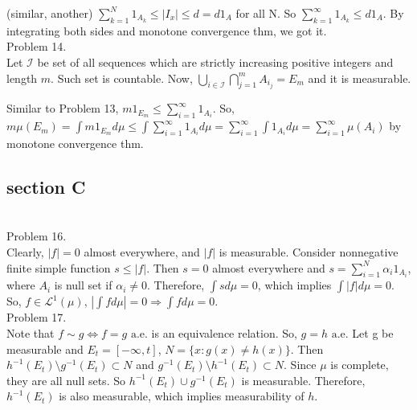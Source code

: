 (similar, another) $\sum_{k=1}^N 1_{A_k} \leq \left | I_x \right | \leq d = d 1_A$ for all N.
So $\sum_{k=1}^{\infty} 1_{A_k} \leq d1_A$.
By integrating both sides and monotone convergence thm, we got it.\\

Problem 14. \\

Let $\mathcal{I}$ be set of all sequences which are strictly increasing positive integers and length $m$.
Such set is countable. Now, $\bigcup_{i \in \mathcal{I}} \bigcap_{j=1}^m A_{i_j} = E_m$ and it is measurable.

Similar to Problem 13, $m 1_{E_m} \leq \sum_{i=1}^{\infty}1_{A_i}$.
So, $m \mu(E_m) = \int m 1_{E_m} d\mu \leq \int \sum_{i=1}^{\infty}1_{A_i} d\mu = \sum_{i=1}^{\infty} \int 1_{A_i} d\mu = \sum_{i=1}^{\infty}\mu(A_i)$ by monotone convergence thm.

\subsection*{section C} \hfill \\

Problem 16. \\

Clearly, $ \lvert f \rvert = 0$ almost everywhere, and $\lvert f \rvert$ is measurable.
Consider nonnegative finite simple function $s \leq \lvert f \rvert$. Then $s=0$ almost everywhere
and $s = \sum_{i=1}^N \alpha_i 1_{A_i}$, where $A_i$ is null set if $\alpha_i \ne 0$.
Therefore, $\int s d\mu = 0$, which implies $\int \lvert f \rvert d\mu = 0$.
So, $f \in \mathcal{L}^1(\mu)$, $\left | \int f d \mu \right | =0 \Rightarrow \int f d \mu = 0$.\\

Problem 17. \\

Note that $f \sim g \Leftrightarrow f = g\text{ a.e.}$ is an equivalence relation.
So, $g = h \text{ a.e}$.
Let g be measurable and $E_t = \left [ -\infty, t \right]$, $N = \{ x : g(x) \ne h(x)\}$.
Then $h^{-1}(E_t) \setminus g^{-1}(E_t) \subset N$ and $g^{-1}(E_t) \setminus h^{-1}(E_t) \subset N$.
Since $\mu$ is complete, they are all null sets. So $h^{-1}(E_t) \cup g^{-1}(E_t)$ is measurable.
Therefore, $h^{-1}(E_t)$ is also measurable, which implies measurability of $h$.\\
